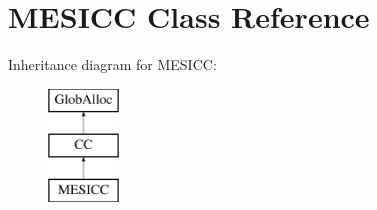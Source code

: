 \hypertarget{classMESICC}{\section{M\-E\-S\-I\-C\-C Class Reference}
\label{classMESICC}
}
Inheritance diagram for M\-E\-S\-I\-C\-C\-:\begin{figure}[H]
\begin{center}
\leavevmode
\includegraphics[height=3.000000cm]{classMESICC}
\end{center}
\end{figure}
